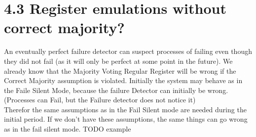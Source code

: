 \documentclass{article}
\begin{document}
    \section*{4.3 Register emulations without correct majority?}
    An eventually perfect failure detector can suspect processes of failing even though they did not fail (as it will only be perfect at some point in the future).
    We already know that the Majority Voting Regular Register will be wrong if the Correct Majority assumption is violated.
    Initially the system may behave as in the Faile Silent Mode, because the failure Detector can initially be wrong. (Processes can Fail, but the Failure detector does not notice it)\\
    Therefor the same assumptions as in the Fail Silent mode are needed during the initial period. If we don't have these assumptions, the same things can go wrong as in the fail silent mode.
    TODO example
\end{document}
